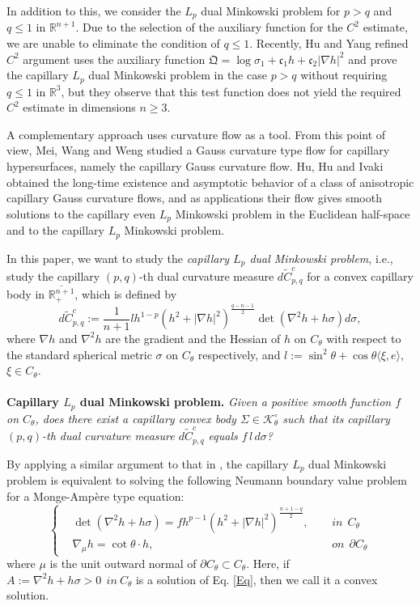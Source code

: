 \documentclass[11pt]{amsart}
\def\R{{\mathfrak R}}
\def\R{\mathbb R}
\numberwithin{equation} {section}
\numberwithin{equation}{section}
\begin{document}
In addition to this, we \cite{GY26v2} consider the $L_p$ dual Minkowski problem for $p>q$ and $q\leq 1$ in $\R^{n+1}$. Due to the selection of the auxiliary function for the $C^2$ estimate, we are unable to eliminate the condition of $q\leq 1$. Recently, Hu and Yang \cite{HY26} refined $C^2$ argument uses the auxiliary function $\mathfrak{Q}=\log\sigma_1+\mathfrak{c}_1 h+\mathfrak{c}_2 |\nabla h|^2$ and prove the capillary $L_p$ dual Minkowski problem in the case $p>q$ without requiring $q\leq 1$ in $\R^3$, but they observe that this test function does not yield the required $C^2$ estimate in dimensions $n\geq 3$. 

A complementary approach uses curvature flow as a tool. From this point of view, Mei, Wang and Weng \cite{MWW25c} studied a Gauss curvature type flow for capillary hypersurfaces, namely the capillary Gauss curvature flow. Hu, Hu and Ivaki \cite{HHI25} obtained the long-time existence and asymptotic behavior of a class of anisotropic capillary Gauss curvature flows, and as applications their flow gives smooth solutions to the capillary even $L_p$ Minkowski problem in the Euclidean half-space and to the capillary $L_p$ Minkowski problem. 

In this paper, we want to study the {\emph{capillary $L_p$ dual Minkowski problem}}, i.e., study the capillary $(p,q)$-th dual curvature measure $d\tilde{C}^c_{p,q}$ for a convex capillary body in $\overline{\mathbb{R}_+^{n+1}}$, which is defined by
$$d\tilde{C}^c_{p,q}:= \frac{1}{n+1}lh^{1-p}\left(h^2 + |\nabla h|^2\right)^{\frac{q-n-1}{2}}\det(\nabla^2 h+h\sigma)d\sigma,$$
where $\nabla h$ and $\nabla^2 h$ are the gradient and the Hessian of $h$ on $C_{\theta}$ with respect to the standard spherical metric $\sigma$ on $C_{\theta}$ respectively, and $l:=\sin^2\theta + \cos\theta\langle\xi,e\rangle$, $\xi\in C_{\theta}$.\\ 
\\
{\bf Capillary $L_p$ dual Minkowski problem.} \emph{Given a positive smooth function $f$ on $C_{\theta}$, does there exist a capillary convex body $\Sigma\in \mathcal{K}^{\circ}_{\theta}$ such that its capillary $(p,q)$-th dual curvature measure $d\tilde{C}^c_{p,q}$ equals $f\,l\,d\sigma$?}

By applying a similar argument to that in \cite[Proposition 2.4]{MWW25a}, the capillary $L_p$ dual Minkowski problem is equivalent to solving the following Neumann boundary value problem for a Monge-Amp\`ere type equation:
\begin{equation}\label{Eq}
\left\{
\begin{aligned}
&\det\left(\nabla^2 h + h\sigma\right)=fh^{p-1}\left(h^2 + |\nabla h|^2\right)^{\frac{n+1-q}{2}}, ~~&&in~~C_{\theta}\\
&\nabla_{\mu} h=\cot\theta\cdot h,  ~~&& on~~\partial C_{\theta}
\end{aligned}
\right.
\end{equation}
where $\mu$ is the unit outward normal of $\partial C_{\theta}\subset C_{\theta}$. Here, if 
$A:=\nabla^2 h + h\sigma >0 ~~in~C_{\theta}$
is a solution of Eq. \eqref{Eq}, then we call it a convex solution.
\end{document}
